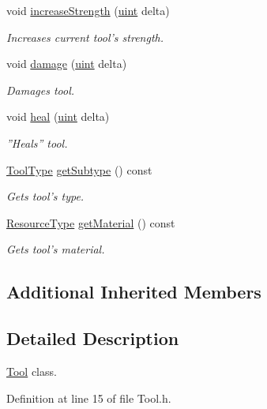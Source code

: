 \begin{DoxyCompactItemize}
void \hyperlink{classTool_a39a24ab98a0b9acfad17f987fd57272e}{increase\-Strength} (\hyperlink{BasicTypes_8h_a91ad9478d81a7aaf2593e8d9c3d06a14}{uint} delta)
\begin{DoxyCompactList}\small\item\em Increases current tool's strength. \end{DoxyCompactList}\item 
void \hyperlink{classTool_aff5fb696dc98cf8892b4db6350495ca5}{damage} (\hyperlink{BasicTypes_8h_a91ad9478d81a7aaf2593e8d9c3d06a14}{uint} delta)
\begin{DoxyCompactList}\small\item\em Damages tool. \end{DoxyCompactList}\item 
void \hyperlink{classTool_ac7103fa90707cbc29ceb31bc7f941571}{heal} (\hyperlink{BasicTypes_8h_a91ad9478d81a7aaf2593e8d9c3d06a14}{uint} delta)
\begin{DoxyCompactList}\small\item\em ''Heals'' tool. \end{DoxyCompactList}\item 
\hyperlink{BasicTypes_8h_a38675390df8e0ebbab2867be799b7160}{Tool\-Type} \hyperlink{classTool_a29cba502e96018d9db4c2ad9bf364732}{get\-Subtype} () const 
\begin{DoxyCompactList}\small\item\em Gets tool's type. \end{DoxyCompactList}\item 
\hyperlink{BasicTypes_8h_a8571efa4409be32e28abf3ea74a0dbb1}{Resource\-Type} \hyperlink{classTool_a1d1c874a76a20b718ce3b7c344a34944}{get\-Material} () const 
\begin{DoxyCompactList}\small\item\em Gets tool's material. \end{DoxyCompactList}\end{DoxyCompactItemize}
\subsection*{Additional Inherited Members}


\subsection{Detailed Description}
\hyperlink{classTool}{Tool} class. 

Definition at line 15 of file Tool.\-h.



